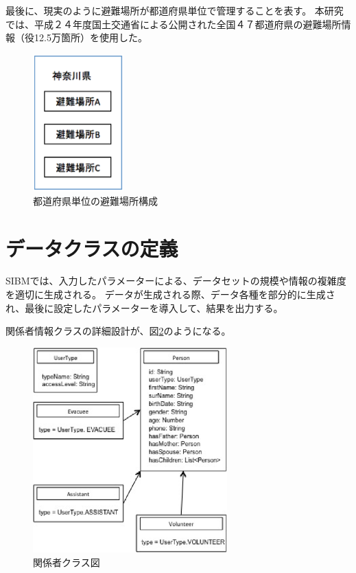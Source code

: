 最後に、現実のように避難場所が都道府県単位で管理することを表す。
本研究では、平成２４年度国土交通省による公開された全国４７都道府県の避難場所情報（役12.5万箇所）を使用した。

\begin{figure}[h!]
 	\begin{center}
 		\includegraphics[width=35mm]{./images/fig3.eps}
 		\caption{都道府県単位の避難場所構成}
 		\label{fig:sibm_prefecture}
 	\end{center}
\end{figure}

\section{データクラスの定義}

SIBMでは、入力したパラメーターによる、データセットの規模や情報の複雑度を適切に生成される。
データが生成される際、データ各種を部分的に生成され、最後に設定したパラメーターを導入して、結果を出力する。

関係者情報クラスの詳細設計が、図\ref{fig:sibm_class_person}のようになる。

\begin{figure}[h!]
 	\begin{center}
 		\includegraphics[width=75mm]{./images/class_person.eps}
 		\caption{関係者クラス図}
 		\label{fig:sibm_class_person}
 	\end{center}
\end{figure}

